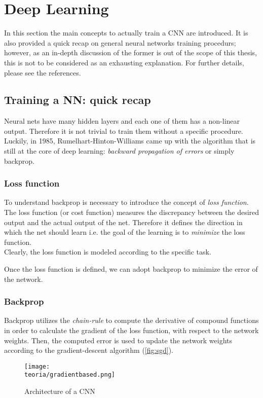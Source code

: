 \section{Deep Learning}
In this section the main concepts to actually train a CNN are introduced. It is also provided a quick recap on general neural networks training procedurs; however, as an in-depth discussion of the former is out of the scope of this thesis, this is not to be considered as an exhausting explanation. For further details, please see the references. 

\subsection{Training a NN: quick recap}
Neural nets have many hidden layers and each one of them has a non-linear output. Therefore it is not trivial to train them without a specific procedure. Luckily, in 1985,  Rumelhart-Hinton-Williams came up with the algorithm that is still at the core of deep learning:  \textit{backward propagation of errors} or simply backprop. 
\newline 


\subsubsection{Loss function}
To understand backprop is necessary to introduce the concept of \emph{loss function}. The loss function (or cost function) measures the discrepancy between the desired output and the actual output of the net. Therefore it defines the direction in which the net should learn i.e. the goal of the learning is to \emph{minimize} the loss function. \\
Clearly, the loss function is modeled according to the specific task. 

Once the loss function is defined, we can adopt backprop to minimize the error of the network. 


\subsubsection{Backprop}
Backprop utilizes the \emph{chain-rule} to compute the derivative of compound functions in order to calculate the gradient of the loss function, with respect to the network weights. Then, the computed error is used to update the network weights according to the gradient-descent algorithm (\ref{fig:sgd}). 

\begin{figure}[h!]
 \centering
 \texttt{[image: \\teoria/gradientbased.png]} 
 \caption{Architecture of a CNN}
 \label{fig:cnn4}
\end{figure}


